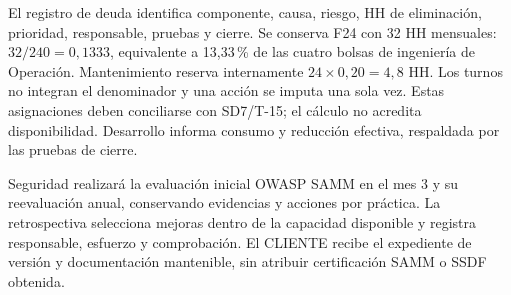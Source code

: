 El registro de deuda identifica componente, causa, riesgo, HH de eliminación, prioridad, responsable, pruebas y cierre. Se conserva F24 con 32 HH mensuales: $32/240=0,1333$, equivalente a 13,33\,\% de las cuatro bolsas de ingeniería de Operación. Mantenimiento reserva internamente $24\times0,20=4,8$ HH. Los turnos no integran el denominador y una acción se imputa una sola vez. Estas asignaciones deben conciliarse con SD7/T-15; el cálculo no acredita disponibilidad. Desarrollo informa consumo y reducción efectiva, respaldada por las pruebas de cierre. \parencite[RT-21.21, p.~38]{sd6-bt}

Seguridad realizará la evaluación inicial OWASP SAMM en el mes 3 y su reevaluación anual, conservando evidencias y acciones por práctica. La retrospectiva selecciona mejoras dentro de la capacidad disponible y registra responsable, esfuerzo y comprobación. El CLIENTE recibe el expediente de versión y documentación mantenible, sin atribuir certificación SAMM o SSDF obtenida. \parencites{sd6-samm}[RT-11.28, p.~24]{sd6-bt}

